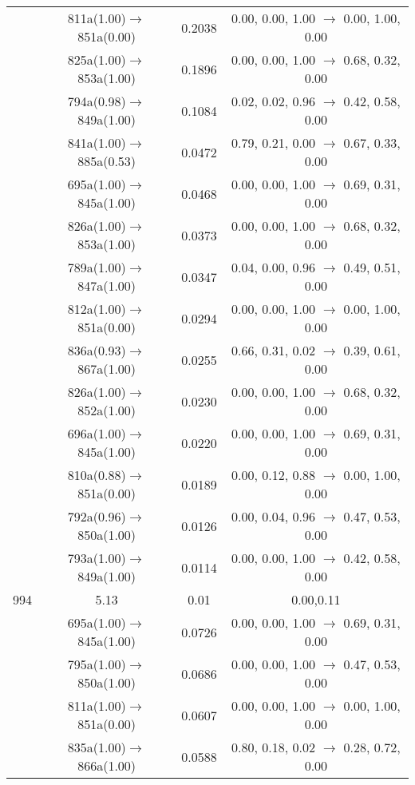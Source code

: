 \documentclass[10pt,a4paper]{article}
\begin{document}
\begin{longtable}{c|c|c|c}
  	& 811a(1.00)$\rightarrow$851a(0.00) &	 0.2038 &	 0.00, 0.00, 1.00 $\rightarrow$ 0.00, 1.00, 0.00 \\ 
 	& 825a(1.00)$\rightarrow$853a(1.00) &	 0.1896 &	 0.00, 0.00, 1.00 $\rightarrow$ 0.68, 0.32, 0.00 \\ 
 	& 794a(0.98)$\rightarrow$849a(1.00) &	 0.1084 &	 0.02, 0.02, 0.96 $\rightarrow$ 0.42, 0.58, 0.00 \\ 
 	& 841a(1.00)$\rightarrow$885a(0.53) &	 0.0472 &	 0.79, 0.21, 0.00 $\rightarrow$ 0.67, 0.33, 0.00 \\ 
 	& 695a(1.00)$\rightarrow$845a(1.00) &	 0.0468 &	 0.00, 0.00, 1.00 $\rightarrow$ 0.69, 0.31, 0.00 \\ 
 	& 826a(1.00)$\rightarrow$853a(1.00) &	 0.0373 &	 0.00, 0.00, 1.00 $\rightarrow$ 0.68, 0.32, 0.00 \\ 
 	& 789a(1.00)$\rightarrow$847a(1.00) &	 0.0347 &	 0.04, 0.00, 0.96 $\rightarrow$ 0.49, 0.51, 0.00 \\ 
 	& 812a(1.00)$\rightarrow$851a(0.00) &	 0.0294 &	 0.00, 0.00, 1.00 $\rightarrow$ 0.00, 1.00, 0.00 \\ 
 	& 836a(0.93)$\rightarrow$867a(1.00) &	 0.0255 &	 0.66, 0.31, 0.02 $\rightarrow$ 0.39, 0.61, 0.00 \\ 
 	& 826a(1.00)$\rightarrow$852a(1.00) &	 0.0230 &	 0.00, 0.00, 1.00 $\rightarrow$ 0.68, 0.32, 0.00 \\ 
 	& 696a(1.00)$\rightarrow$845a(1.00) &	 0.0220 &	 0.00, 0.00, 1.00 $\rightarrow$ 0.69, 0.31, 0.00 \\ 
 	& 810a(0.88)$\rightarrow$851a(0.00) &	 0.0189 &	 0.00, 0.12, 0.88 $\rightarrow$ 0.00, 1.00, 0.00 \\ 
 	& 792a(0.96)$\rightarrow$850a(1.00) &	 0.0126 &	 0.00, 0.04, 0.96 $\rightarrow$ 0.47, 0.53, 0.00 \\ 
 	& 793a(1.00)$\rightarrow$849a(1.00) &	 0.0114 &	 0.00, 0.00, 1.00 $\rightarrow$ 0.42, 0.58, 0.00 \\ 
 \hline994 &	 5.13 &	 0.01 &	 0.00,0.11 \\ 
  	& 695a(1.00)$\rightarrow$845a(1.00) &	 0.0726 &	 0.00, 0.00, 1.00 $\rightarrow$ 0.69, 0.31, 0.00 \\ 
 	& 795a(1.00)$\rightarrow$850a(1.00) &	 0.0686 &	 0.00, 0.00, 1.00 $\rightarrow$ 0.47, 0.53, 0.00 \\ 
 	& 811a(1.00)$\rightarrow$851a(0.00) &	 0.0607 &	 0.00, 0.00, 1.00 $\rightarrow$ 0.00, 1.00, 0.00 \\ 
 	& 835a(1.00)$\rightarrow$866a(1.00) &	 0.0588 &	 0.80, 0.18, 0.02 $\rightarrow$ 0.28, 0.72, 0.00 \\ 

\end{longtable}
\end{document}
